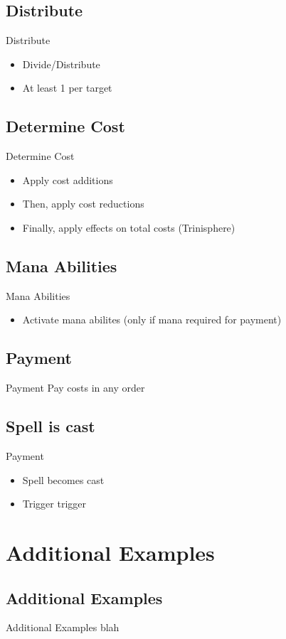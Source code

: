 \documentclass[utf8x]{beamer}
\newcounter{lines per second}
\newcounter{lines per page}
\newcounter{frames per second}
\newcounter{total frames}
\newcounter{total lines}
\newcounter{total time}
\begin{document}
  \subsection*{Distribute}
    \begin{frame}{Distribute}
      \begin{itemize}
        \item Divide/Distribute
        \item At least 1 per target
      \end{itemize}
    \end{frame}

  \subsection*{Determine Cost}
    \begin{frame}{Determine Cost}
      \begin{itemize}
        \item Apply cost additions
        \item Then, apply cost reductions
        \item Finally, apply effects on total costs (Trinisphere)
      \end{itemize}
    \end{frame}

  \subsection*{Mana Abilities}
    \begin{frame}{Mana Abilities}
      \begin{itemize}
        \item Activate mana abilites (only if mana required for payment)
      \end{itemize}
    \end{frame}

  \subsection*{Payment}
    \begin{frame}{Payment}
      Pay costs in any order
    \end{frame}

  \subsection*{Spell is cast}
    \begin{frame}{Payment}
      \begin{itemize}
        \item Spell becomes cast
        \item Trigger trigger
      \end{itemize}
    \end{frame}

 \section{Additional Examples}
  \subsection*{Additional Examples}
  
    \begin{frame}{Additional Examples}
      blah
    \end{frame}
  
\end{document}

